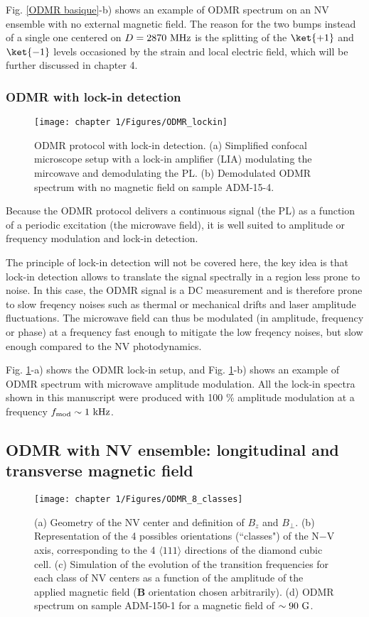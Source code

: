 \documentclass[a4paper,11pt]{report}
\begin{document}
\begin{refsection}
Fig. \ref{ODMR basique}-b) shows an example of ODMR spectrum on an NV ensemble with no external magnetic field. The reason for the two bumps instead of a single one centered on $D=2870\ \rm MHz$ is the splitting of the $\ket{+1}$ and $\ket{-1}$ levels occasioned by the strain and local electric field, which will be further discussed in chapter 4.

\subsubsection{ODMR with lock-in detection}
\begin{figure}[h!]
\centering
\texttt{[image: chapter 1/Figures/ODMR\_lockin]}
\caption{ODMR protocol with lock-in detection. (a) Simplified confocal microscope setup with a lock-in amplifier (LIA) modulating the mircowave and demodulating the PL. (b) Demodulated ODMR spectrum with no magnetic field on sample ADM-15-4.}
\label{ODMR lockin}
\end{figure}


Because the ODMR protocol delivers a continuous signal (the PL) as a function of a periodic excitation (the microwave field), it is well suited to amplitude or frequency modulation and lock-in detection. 

The principle of lock-in detection will not be covered here, the key idea is that lock-in detection allows to translate the signal spectrally in a region less prone to noise. In this case, the ODMR signal is a DC measurement and is therefore prone to slow freqency noises such as thermal or mechanical drifts and laser amplitude fluctuations. The microwave field can thus be modulated (in amplitude, frequency or phase) at a frequency fast enough to mitigate the low freqency noises, but slow enough compared to the NV photodynamics. 

Fig. \ref{ODMR lockin}-a) shows the ODMR lock-in setup, and Fig. \ref{ODMR lockin}-b) shows an example of ODMR spectrum with microwave amplitude modulation. All the lock-in spectra shown in this manuscript were produced with 100 \% amplitude modulation at a frequency $f_{\rm mod} \sim 1\ \rm kHz$.

\subsection{ODMR with NV ensemble: longitudinal and transverse magnetic field}

\begin{figure}[h!]
\centering
\texttt{[image: chapter 1/Figures/ODMR\_8\_classes]}
\caption{(a) Geometry of the NV center and definition of $B_z$ and $B_\perp$. (b) Representation of the 4 possibles orientations (``classes") of the N$-$V axis, corresponding to the 4 $\langle 111 \rangle$ directions of the diamond cubic cell. (c) Simulation of the evolution of the transition frequencies for each class of NV centers as a function of the amplitude of the applied magnetic field ($\textbf{B}$ orientation chosen arbitrarily). (d) ODMR spectrum on sample ADM-150-1 for a magnetic field of $\sim 90\ \rm G$.}
\label{ODMR 8 classes}
\end{figure}


\end{refsection}
\end{document}
